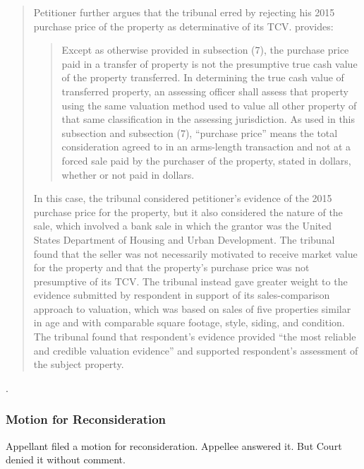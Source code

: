\documentclass[12pt,\documentclassflag]{michiganCourtOfAppealsBrief}
\begin{document}
\begin{quotation}
  Petitioner further argues that the tribunal erred by rejecting his 2015 purchase price of the
  property as determinative of its TCV. \cite{MCL 211.27(6)} provides:

  \begin{quote}
Except as otherwise provided in subsection (7), the purchase price paid in a
transfer of property is not the presumptive true cash value of the property
transferred. In determining the true cash value of transferred property, an assessing
officer shall assess that property using the same valuation method used to value all
other property of that same classification in the assessing jurisdiction. As used in
this subsection and subsection (7), ``purchase price'' means the total consideration
agreed to in an arms-length transaction and not at a forced sale paid by the purchaser
of the property, stated in dollars, whether or not paid in dollars.
\end{quote}

In this case, the tribunal considered petitioner's evidence of the 2015 purchase price for the
property, but it also considered the nature of the sale, which involved a bank sale in which the
grantor was the United States Department of Housing and Urban Development. The tribunal found
that the seller was not necessarily motivated to receive market value for the property and that the
property's purchase price was not presumptive of its TCV. The tribunal instead gave greater
weight to the evidence submitted by respondent in support of its sales-comparison approach to
valuation, which was based on sales of five properties similar in age and with comparable square
footage, style, siding, and condition. The tribunal found that respondent's evidence provided ``the
most reliable and credible valuation evidence'' and supported respondent's assessment of the
subject property.
\end{quotation}
.

\subsubsection{Motion for Reconsideration}

Appellant filed a motion for reconsideration. Appellee answered it. But Court denied it without comment.

\end{document}
